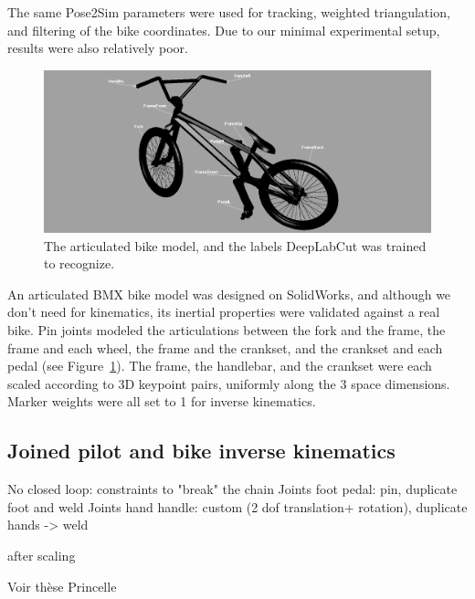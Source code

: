 The same Pose2Sim parameters were used for tracking, weighted triangulation, and filtering of the bike coordinates. Due to our minimal experimental setup, results were also relatively poor.

\begin{figure}[hbtp]
	\centering
	\def\svgwidth{1\columnwidth}
	\fontsize{10pt}{10pt}\selectfont
	\includegraphics[width=\linewidth]{"../Chap7/Figures/Bike_keypoints.PNG"}
	\caption{The articulated bike model, and the labels DeepLabCut was trained to recognize.}
	\label{fig_bikemodel}
\end{figure}

An articulated BMX bike model was designed on SolidWorks, and although we don't need for kinematics, its inertial properties were validated against a real bike. Pin joints modeled the articulations between the fork and the frame, the frame and each wheel, the frame and the crankset, and the crankset and each pedal (see Figure~\ref{fig_bikemodel}). The frame, the handlebar, and the crankset were each scaled according to 3D keypoint pairs, uniformly along the 3 space dimensions. Marker weights were all set to 1 for inverse kinematics.




\subsection{Joined pilot and bike inverse kinematics}
No closed loop: constraints to "break" the chain
Joints foot pedal: pin, duplicate foot and weld
Joints hand handle: custom (2 dof translation+ rotation), duplicate hands -> weld

after scaling



Voir thèse Princelle 


